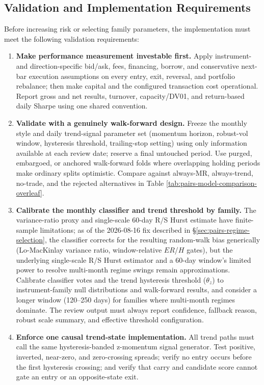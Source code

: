 \subsection{Validation and Implementation Requirements}

Before increasing risk or selecting family parameters, the implementation must meet
the following validation requirements:

\begin{enumerate}
\item \textbf{Make performance measurement investable first.} Apply instrument- and
direction-specific bid/ask, fees, financing, borrow, and conservative next-bar
execution assumptions on every entry, exit, reversal, and portfolio rebalance;
then make capital and the configured transaction cost operational. Report gross
and net results, turnover, capacity/DV01, and return-based daily Sharpe using one
shared convention.

\item \textbf{Validate with a genuinely walk-forward design.} Freeze the monthly style
and daily trend-signal parameter set (momentum horizon, robust-vol window, hysteresis
threshold, trailing-stop setting) using only information available at each review date;
reserve a final untouched period. Use
purged, embargoed, or anchored walk-forward folds where overlapping holding periods
make ordinary splits optimistic. Compare against always-MR, always-trend, no-trade,
and the rejected alternatives in Table \ref{tab:pairs-model-comparison-overleaf}.

\item \textbf{Calibrate the monthly classifier and trend threshold by family.} The
variance-ratio proxy and single-scale 60-day R/S Hurst estimate have finite-sample
limitations; as of the 2026-08-16 fix described in
\S\ref{sec:pairs-regime-selection}, the classifier corrects for the resulting
random-walk bias generically (Lo-MacKinlay variance ratio, window-relative $ER$/$H$
gates), but the underlying single-scale R/S Hurst estimator and a $60$-day window's
limited power to resolve multi-month regime swings remain approximations. Calibrate
classifier votes and the trend hysteresis threshold ($\theta_z$) to instrument-family
null distributions and walk-forward results, and consider a longer window (120--250
days) for families where multi-month regimes dominate. The review output must always
report confidence, fallback reason, robust scale summary, and effective threshold
configuration.

\item \textbf{Enforce one causal trend-state implementation.} All trend paths must
call the same hysteresis-banded z-momentum signal generator. Test positive,
inverted, near-zero, and zero-crossing spreads; verify no entry occurs before the
first hysteresis crossing; and verify that carry and candidate score cannot gate an
entry or an opposite-state exit.


\end{enumerate}
